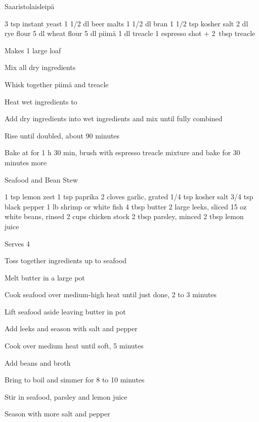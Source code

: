\begin{recipe}{Saaristolaisleipä}{\vegetarian{}}
\begin{ingredients}
3 tsp instant yeast
1 1/2 dl beer malts
1 1/2 dl bran
1 1/2 tsp kosher salt
2 dl rye flour
5 dl wheat flour
5 dl piimä
1 dl treacle
1 espresso shot + 2~tbsp treacle
\end{ingredients}
\nextcolumn
Makes 1 large loaf
\begin{steps}
    \item Mix all dry ingredients
    \item Whisk together piimä and treacle
    \item Heat wet ingredients to 
    \item Add dry ingredients into wet ingredients and mix until fully combined
    \item Rise until doubled, about 90 minutes
    \item Bake at  for 1 h 30 min, brush with espresso treacle mixture and bake for 30 minutes more
\end{steps}
\end{recipe}

\begin{denserecipe}{Seafood and Bean Stew}{}
\begin{ingredients}
1 tsp lemon zest
1 tsp paprika
2 cloves garlic, grated
1/4 tsp kosher salt
3/4 tsp black pepper
1 lb shrimp or white fish
4 tbsp butter
2 large leeks, sliced
15 oz white beans, rinsed
2 cups chicken stock
2 tbsp parsley, minced
2 tbsp lemon juice
\end{ingredients}
\nextcolumn
Serves 4
\begin{steps}
    \item Toss together ingredients up to seafood
    \item Melt butter in a large pot
    \item Cook seafood over medium-high heat until just done, 2 to 3 minutes
    \item Lift seafood aside leaving butter in pot
    \item Add leeks and season with salt and pepper
    \item Cook over medium heat until soft, 5 minutes
    \item Add beans and broth
    \item Bring to boil and simmer for 8 to 10 minutes
    \item Stir in seafood, parsley and lemon juice
    \item Season with more salt and pepper
\end{steps}
\end{denserecipe}

